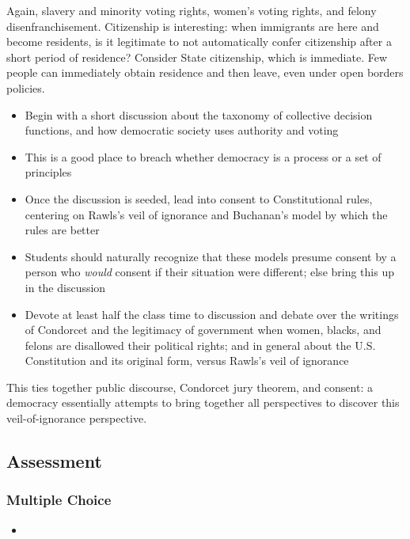 \begin{todo}
    Again, slavery and minority voting rights, women's voting rights, and felony disenfranchisement.  Citizenship is interesting:  when immigrants are here and become residents, is it legitimate to not automatically confer citizenship after a short period of residence?  Consider State citizenship, which is immediate.  Few people can immediately obtain residence and then leave, even under open borders policies.
\end{todo}
\begin{itemize}
    \item Begin with a short discussion about the taxonomy of collective decision functions, and how democratic society uses authority and voting

    \item This is a good place to breach whether democracy is a process or a set of principles

    \item Once the discussion is seeded, lead into consent to Constitutional rules, centering on Rawls's veil of ignorance and Buchanan's model by which the rules are better

    \item Students should naturally recognize that these models presume consent by a person who \textit{would} consent if their situation were different; else bring this up in the discussion


    \item Devote at least half the class time to discussion and debate over the writings of Condorcet and the legitimacy of government when women, blacks, and felons are disallowed their political rights; and in general about the U.S. Constitution and its original form, versus Rawls's veil of ignorance
\end{itemize}

\begin{boxcomment}
    This ties together public discourse, Condorcet jury theorem, and consent:  a democracy essentially attempts to bring together all perspectives to discover this veil-of-ignorance perspective.
\end{boxcomment}
\subsection{Assessment}

\subsubsection{Multiple Choice}

\begin{itemize}
    \item {}


\end{itemize}